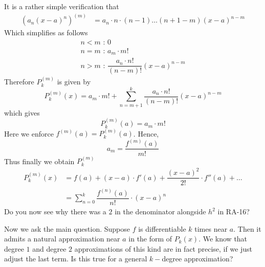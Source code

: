 It is a rather simple verification that\begin{align*}(a_n(x - a)^n)^{(m)} &= a_n\cdot n \cdot (n - 1) \ldots (n + 1 - m)(x - a)^{n - m}\end{align*}
Which simplifies as follows$$
\begin{array}{l}
n < m \text{ : } 0\\
n = m \text{ : } a_m\cdot m!\\
n > m \text{ : } \dfrac{a_n\cdot n!}{(n - m)!}(x - a)^{n - m}
\end{array}
$$
Therefore $P_k^{(m)}$ is given by
$$
P_k^{(m)}(x) = a_m\cdot m! + \sum\limits_{n = m + 1}^{k}\dfrac{a_n \cdot n!}{(n - m)!}(x - a)^{n - m}
$$
which gives
$$
P_k^{(m)}(a) = a_m\cdot m!
$$
Here we enforce $f^{(m)}(a) = P_k^{(m)}(a)$. Hence,
$$
a_m = \dfrac{f^{(m)}(a)}{m!}
$$
Thus finally we obtain $P_k^{(m)}$
\begin{align*}
P_k^{(m)}(x) &= f(a) + (x - a)\cdot f'(a) + \dfrac{(x - a)^2}{2!}\cdot f''(a) + \ldots \\
			 &= \sum\limits_{n = 0}^{k}\dfrac{f^{(n)}(a)}{n!}\cdot (x - a)^n
\end{align*}
Do you now see why there was a $2$ in the denominator alongside $h^2$ in RA-16?

Now we ask the main question. Suppose $f$ is differentiable $k$ times near $a$. Then it admits a natural approximation near $a$ in the form of $P_k(x)$. We know that degree $1$ and degree $2$ approximations of this kind are in fact precise, if we just adjust the last term. Is this true for a general $k-$degree approximation?

